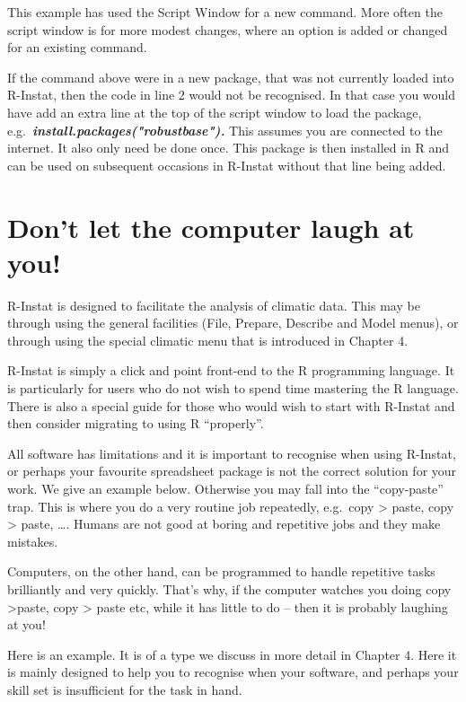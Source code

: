 \documentclass[
  letterpaper,
  DIV=11,
  numbers=noendperiod]{scrreprt}
\begin{document}
This example has used the Script Window for a new command. More often
the script window is for more modest changes, where an option is added
or changed for an existing command.

If the command above were in a new package, that was not currently
loaded into R-Instat, then the code in line 2 would not be recognised.
In that case you would have add an extra line at the top of the script
window to load the package,
e.g.~\textbf{\emph{install.packages("robustbase").}} This assumes you
are connected to the internet. It also only need be done once. This
package is then installed in R and can be used on subsequent occasions
in R-Instat without that line being added.

\section{Don't let the computer laugh at
you!}\label{dont-let-the-computer-laugh-at-you}

R-Instat is designed to facilitate the analysis of climatic data. This
may be through using the general facilities (File, Prepare, Describe and
Model menus), or through using the special climatic menu that is
introduced in Chapter 4.

R-Instat is simply a click and point front-end to the R programming
language. It is particularly for users who do not wish to spend time
mastering the R language. There is also a special guide for those who
would wish to start with R-Instat and then consider migrating to using R
``properly''.

All software has limitations and it is important to recognise when using
R-Instat, or perhaps your favourite spreadsheet package is not the
correct solution for your work. We give an example below. Otherwise you
may fall into the ``copy-paste'' trap. This is where you do a very
routine job repeatedly, e.g.~copy \textgreater{} paste, copy
\textgreater{} paste, \ldots. Humans are not good at boring and
repetitive jobs and they make mistakes.

Computers, on the other hand, can be programmed to handle repetitive
tasks brilliantly and very quickly. That's why, if the computer watches
you doing copy \textgreater paste, copy \textgreater{} paste etc, while
it has little to do -- then it is probably laughing at you!

Here is an example. It is of a type we discuss in more detail in Chapter
4. Here it is mainly designed to help you to recognise when your
software, and perhaps your skill set is insufficient for the task in
hand.
\end{document}
